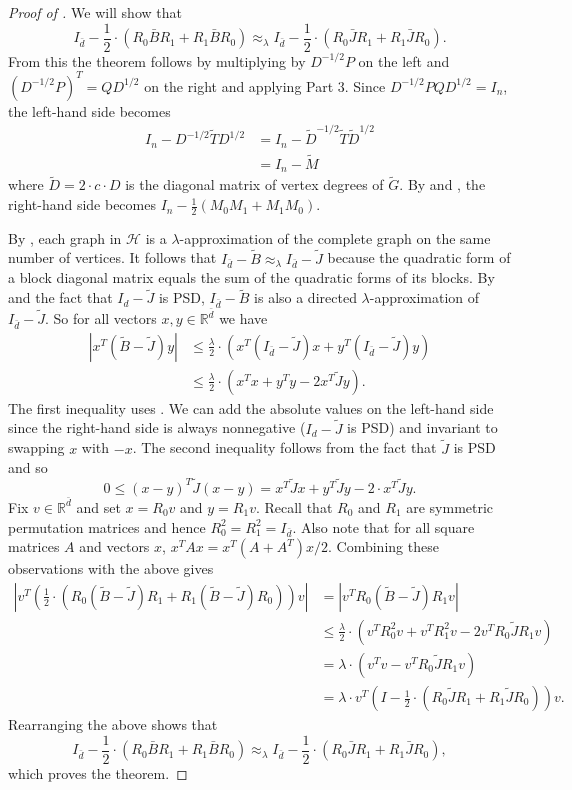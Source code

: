 \documentclass{toc}
\newcommand{\wt}{\widetilde}   %
\numberwithin{myalgctr}{section}
\theoremstyle{named}
\begin{document}
\begin{proof}[Proof of ]
We will show that
\[
I_{\bar{d}}-\frac{1}{2}\cdot(R_0\bar{B}R_1+R_1\bar{B}R_0)\approx_{\lambda} I_{\bar{d}}-\frac{1}{2}\cdot(R_0\bar{J}R_1+R_1\bar{J}R_0).
\]
{}From this the theorem follows by multiplying by $D^{-1/2}P$ on the left and $(D^{-1/2}P)^T=QD^{1/2}$ on the right and applying  Part 3. Since $D^{-1/2}PQD^{1/2}=I_n$, the left-hand side becomes 
\begin{align*}
I_n-D^{-1/2}\wt{T}D^{1/2}&=I_n-\wt{D}^{-1/2}\wt{T}\wt{D}^{1/2}\\
&=I_n-\wt{M}
\end{align*}
where $\wt{D}=2\cdot c\cdot D$ is the diagonal matrix of vertex degrees of $\wt{G}$. By  and , the right-hand side becomes $I_n-\frac{1}{2}(M_0M_1+M_1M_0)$.

By , each graph in $\mathcal{H}$ is a $\lambda$-approximation of the complete graph on the same number of vertices. It follows that $I_{\bar{d}}-\wt{B}\approx_\lambda I_{\bar{d}}-\wt{J}$  because the quadratic form of a block diagonal matrix equals the sum of the quadratic forms of its blocks. By  and the fact that $I_d-\wt{J}$ is PSD, $I_{\bar{d}}-\wt{B}$ is also a directed $\lambda$-approximation of $I_{\bar{d}}-\wt{J}$. So for all vectors $x,y\in\mathbb{R}^{\bar{d}}$ we have 
\begin{align*}
\left|x^{T}(\wt{B}-\wt{J})y\right| &\leq \frac{\lambda}{2}\cdot (x^{T}(I_{\bar{d}}-\wt{J})x+y^{T}(I_{\bar{d}}-\wt{J})y)\\
&\leq \frac{\lambda}{2}\cdot (x^{T}x + y^Ty - 2x^{T}\wt{J}y).
\end{align*}
The first inequality uses . We can add the absolute values on the left-hand side since the right-hand side is always nonnegative ($I_d-\wt{J}$ is PSD) and invariant to swapping $x$ with $-x$. The second inequality follows from the fact that $\wt{J}$ is PSD and so 
\[
0 \leq (x-y)^{T}\wt{J}(x-y) = x^{T}\wt{J}x+y^{T}\wt{J}y-2\cdot x^{T}\wt{J}y.
\]
Fix $v\in\mathbb{R}^{\bar{d}}$ and set $x=R_0v$ and $y=R_1v$. Recall that $R_0$ and $R_1$ are symmetric permutation matrices and hence $R_0^2=R_1^2=I_{\bar{d}}$. Also note that for all square matrices $A$ and vectors $x$, $x^{T}Ax=x^{T}(A+A^{T})x/2$. Combining these observations with the above gives
\begin{align*}
\left|v^{T}\left(\frac{1}{2}\cdot\left(R_0(\wt{B}-\wt{J})R_1+R_1(\wt{B}-\wt{J})R_0\right)\right)v\right|&=\left|v^{T}R_0(\wt{B}-\wt{J})R_1v\right| \\
&\leq \frac{\lambda}{2}\cdot (v^{T}R_0^2v + v^TR_1^2v - 2v^{T}R_0\wt{J}R_1 v)\\
&=\lambda\cdot (v^{T}v-v^{T}R_0\wt{J}R_1 v)\\
&=\lambda\cdot v^{T}\left(I-\frac{1}{2}\cdot\left(R_0\wt{J}R_1+R_1\wt{J}R_0\right)\right)v.
\end{align*}
Rearranging the above shows that
\[
I_{\bar{d}}-\frac{1}{2}\cdot(R_0\bar{B}R_1+R_1\bar{B}R_0)\approx_{\lambda} I_{\bar{d}}-\frac{1}{2}\cdot(R_0\bar{J}R_1+R_1\bar{J}R_0),
\]
which proves the theorem.
\end{proof}
\end{document}
